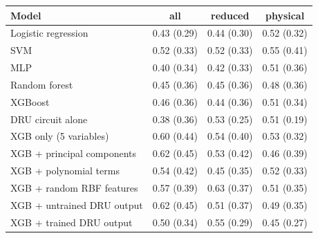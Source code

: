 \begin{tabular}{lccc}
\toprule
Model & all & reduced & physical \\
\midrule
Logistic regression & 0.43 (0.29) & 0.44 (0.30) & 0.52 (0.32) \\
SVM & 0.52 (0.33) & 0.52 (0.33) & 0.55 (0.41) \\
MLP & 0.40 (0.34) & 0.42 (0.33) & 0.51 (0.36) \\
Random forest & 0.45 (0.36) & 0.45 (0.36) & 0.48 (0.36) \\
XGBoost & 0.46 (0.36) & 0.44 (0.36) & 0.51 (0.34) \\
DRU circuit alone & 0.38 (0.36) & 0.53 (0.25) & 0.51 (0.19) \\
XGB only (5 variables) & 0.60 (0.44) & 0.54 (0.40) & 0.53 (0.32) \\
XGB + principal components & 0.62 (0.45) & 0.53 (0.42) & 0.46 (0.39) \\
XGB + polynomial terms & 0.54 (0.42) & 0.45 (0.35) & 0.52 (0.33) \\
XGB + random RBF features & 0.57 (0.39) & 0.63 (0.37) & 0.51 (0.35) \\
XGB + untrained DRU output & 0.62 (0.45) & 0.51 (0.37) & 0.49 (0.35) \\
XGB + trained DRU output & 0.50 (0.34) & 0.55 (0.29) & 0.45 (0.27) \\
\bottomrule
\end{tabular}
